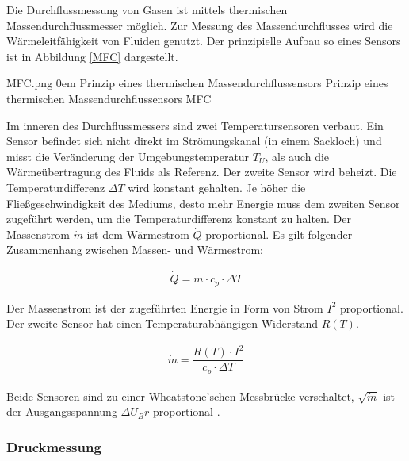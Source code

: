 Die Durchflussmessung von Gasen ist mittels thermischen Massendurchflussmesser möglich. Zur Messung des Massendurchflusses wird die Wärmeleitfähigkeit von Fluiden genutzt. Der prinzipielle Aufbau so eines Sensors ist in Abbildung \ref{MFC} dargestellt.

{MFC.png}
{0em}
{Prinzip eines thermischen Massendurchflussensors}
{Prinzip eines thermischen Massendurchflussensors}
{MFC}

 Im inneren des Durchflussmessers sind zwei Temperatursensoren verbaut. Ein Sensor befindet sich nicht direkt im Strömungskanal (in einem Sackloch) und misst die Veränderung der Umgebungstemperatur $T_U$, als auch die Wärmeübertragung des Fluids als Referenz. Der zweite Sensor wird beheizt. Die Temperaturdifferenz $\Delta T$ wird konstant gehalten. Je höher die Fließgeschwindigkeit des Mediums, desto mehr Energie muss dem zweiten Sensor zugeführt werden, um die Temperaturdifferenz konstant zu halten.  Der Massenstrom $\dot{m}$ ist dem Wärmestrom $\dot{Q}$ proportional. Es gilt folgender Zusammenhang zwischen Massen- und Wärmestrom:

\begin{align}
\dot{Q}=\dot{m} \cdot c_p \cdot  \Delta T
\end{align}

Der Massenstrom ist der zugeführten Energie in Form von Strom $I^2$ proportional. Der zweite Sensor hat einen Temperaturabhängigen Widerstand $R(T)$. 

\begin{align}
\dot{m}=\dfrac{R(T) \cdot I^2}{c_p \cdot \Delta T}
\end{align}

Beide Sensoren sind zu einer Wheatstone'schen Messbrücke verschaltet, $\sqrt{\dot{m}}$ ist der Ausgangsspannung $\Delta U_Br$ proportional .

\subsubsection{Druckmessung}

